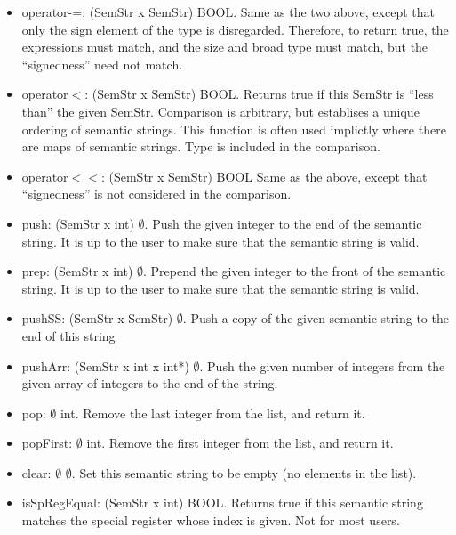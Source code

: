 \begin{itemize}
\item   operator-=: (SemStr x SemStr) \ra BOOL.
    Same as the two above, except that only the sign element of the type is
    disregarded. Therefore, to return true, the expressions must match, and
    the size and broad type must match, but the ``signedness'' need not
    match.

\item   operator$<$: (SemStr x SemStr) \ra BOOL.
    Returns true if this SemStr is ``less than'' the given SemStr. Comparison
    is arbitrary, but establises a unique ordering of semantic strings. This
    function is often used implictly where there are maps of semantic strings.
    Type is included in the comparison.

\item   operator$<<$: (SemStr x SemStr) \ra BOOL
    Same as the above, except that ``signedness'' is not considered in the
    comparison.

\item   push: (SemStr x int) \ra $\emptyset$.
    Push the given integer to the end of the semantic string. It is up to
    the user to make sure that the semantic string is valid.

\item   prep: (SemStr x int) \ra $\emptyset$.
    Prepend the given integer to the front of the semantic string. It is
    up to the user to make sure that the semantic string is valid.

\item   pushSS: (SemStr x SemStr) \ra $\emptyset$.
    Push a copy of the given semantic string to the end of this string

\item   pushArr: (SemStr x int x int*) \ra $\emptyset$.
    Push the given number of integers from the given array of integers to
    the end of the string.

\item   pop: $\emptyset$ \ra int.
    Remove the last integer from the list, and return it.

\item   popFirst: $\emptyset$ \ra int.
    Remove the first integer from the list, and return it.

\item   clear: $\emptyset$ \ra $\emptyset$.
    Set this semantic string to be empty (no elements in the list).

\item   isSpRegEqual: (SemStr x int) \ra BOOL.
    Returns true if this semantic string matches the special register
    whose index is given. Not for most users.


\end{itemize}
